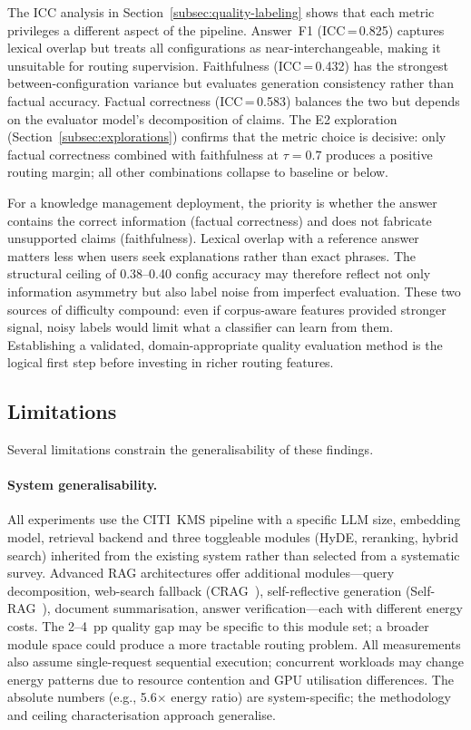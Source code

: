 The ICC analysis in Section~\ref{subsec:quality-labeling} shows that each
metric privileges a different aspect of the pipeline.  Answer~F1
(ICC\,=\,0.825) captures lexical overlap but treats all configurations as
near-interchangeable, making it unsuitable for routing supervision.
Faithfulness (ICC\,=\,0.432) has the strongest between-configuration
variance but evaluates generation consistency rather than factual
accuracy.  Factual correctness (ICC\,=\,0.583) balances the two but
depends on the evaluator model's decomposition of claims.  The E2
exploration (Section~\ref{subsec:explorations}) confirms that the metric
choice is decisive: only factual correctness combined with faithfulness
at $\tau = 0.7$ produces a positive routing margin; all other combinations
collapse to baseline or below.

For a knowledge management deployment, the priority is whether the answer
contains the correct information (factual correctness) and does not
fabricate unsupported claims (faithfulness).  Lexical overlap with a
reference answer matters less when users seek explanations rather than
exact phrases.  The structural ceiling of 0.38--0.40 config accuracy may
therefore reflect not only information asymmetry but also label noise from
imperfect evaluation.  These two sources of difficulty compound: even if
corpus-aware features provided stronger signal, noisy labels would limit
what a classifier can learn from them.  Establishing a validated,
domain-appropriate quality evaluation method is the logical first step
before investing in richer routing features.


\subsection{Limitations}
\label{subsec:limitations}

Several limitations constrain the generalisability of these findings.

\paragraph{System generalisability.}
All experiments use the CITI~KMS pipeline with a specific LLM size,
embedding model, retrieval backend and three toggleable modules (HyDE,
reranking, hybrid search) inherited from the existing system rather than
selected from a systematic survey.  Advanced RAG architectures offer
additional modules---query decomposition, web-search fallback
(CRAG~\cite{crag2024}), self-reflective generation
(Self-RAG~\cite{selfrag2024}), document summarisation, answer
verification---each with different energy costs.  The 2--4~pp quality gap
may be specific to this module set; a broader module space could produce
a more tractable routing problem.  All measurements also assume
single-request sequential execution; concurrent workloads may change
energy patterns due to resource contention and GPU utilisation differences.
The absolute numbers (e.g., 5.6$\times$ energy ratio) are
system-specific; the methodology and ceiling characterisation approach
generalise.

